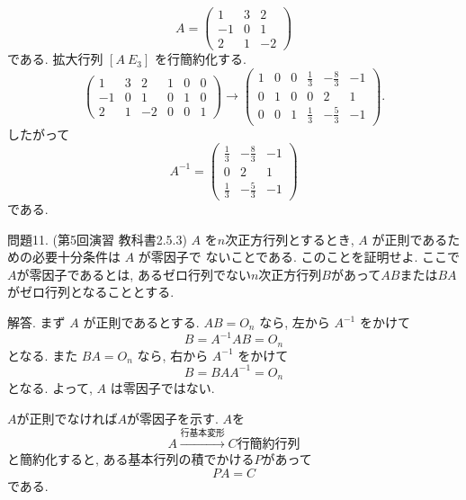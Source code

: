 \documentclass[dvipdfmx,a4paper,11pt]{article} %
\theoremstyle{definition}
\begin{document}
\[
A=
\begin{pmatrix}
1&3&2\\
-1&0&1\\
2&1&-2
\end{pmatrix}
\]
である. 拡大行列 $\left[A\ E_3\right]$ を行簡約化する.
\[
\left(
\begin{array}{rrr|rrr}
1&3&2&1&0&0\\
-1&0&1&0&1&0\\
2&1&-2&0&0&1
\end{array}
\right)
\to
\left(
\begin{array}{rrr|rrr}
1&0&0&\frac13&-\frac83&-1\\
0&1&0&0&2&1\\
0&0&1&\frac13&-\frac53&-1
\end{array}
\right).
\]
したがって
\[
\boxed{
A^{-1}
=
\begin{pmatrix}
\frac13&-\frac83&-1\\
0&2&1\\
\frac13&-\frac53&-1
\end{pmatrix}}
\]
である.


問題11. (第5回演習 教科書2.5.3)
\(A\) を$n$次正方行列とするとき, \(A\) が正則であるための必要十分条件は \(A\) が零因子で
ないことである. このことを証明せよ.
ここで$A$が零因子であるとは, あるゼロ行列でない$n$次正方行列$B$があって$AB$または$BA$がゼロ行列となることとする. 

解答. 
まず $A$ が正則であるとする. $AB=O_n$ なら, 左から $A^{-1}$ をかけて
\[
B=A^{-1}AB=O_n
\]
となる. また $BA=O_n$ なら, 右から $A^{-1}$ をかけて
\[
B=BAA^{-1}=O_n
\]
となる. よって, $A$ は零因子ではない.

$A$が正則でなければ$A$が零因子を示す. 
$A$を
$$
A\overset{\text{行基本変形}}{\longrightarrow} C \text{行簡約行列}
$$
と簡約化すると, ある基本行列の積でかける$P$があって
$$
PA=C
$$
である. 
\end{document}
